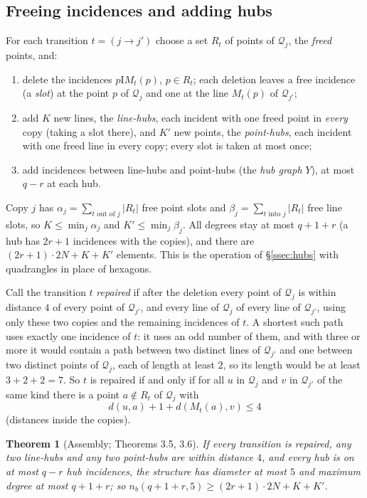 \documentclass[11pt]{amsart}
\newtheorem{theorem}{Theorem}[section]
\theoremstyle{definition}
\theoremstyle{remark}
\newcommand{\I}{\mathrel{\mathrm{I}}}
\newcommand{\cQ}{\mathcal{Q}}
\begin{document}
\subsection{Freeing incidences and adding hubs}\label{ssec:hubs5}
For each transition $t=(j\to j')$ choose a set $R_t$ of points of $\cQ_j$, the \emph{freed} points, and:
\begin{enumerate}[label=\textup{(\arabic*)},leftmargin=2.5em]
\item delete the incidences $p\I M_t(p)$, $p\in R_t$; each deletion leaves a free incidence (a \emph{slot}) at the point $p$ of $\cQ_j$ and one at the line $M_t(p)$ of $\cQ_{j'}$;
\item add $K$ new lines, the \emph{line-hubs}, each incident with one freed point in \emph{every} copy (taking a slot there), and $K'$ new points, the \emph{point-hubs}, each incident with one freed line in every copy; every slot is taken at most once;
\item add incidences between line-hubs and point-hubs (the \emph{hub graph} $Y$), at most $q-r$ at each hub.
\end{enumerate}
Copy $j$ has $\alpha_j=\sum_{t\text{ out of }j}|R_t|$ free point slots and $\beta_j=\sum_{t\text{ into }j}|R_t|$ free line slots, so $K\le\min_j\alpha_j$ and $K'\le\min_j\beta_j$. All degrees stay at most $q+1+r$ (a hub has $2r+1$ incidences with the copies), and there are $(2r+1)\cdot 2N+K+K'$ elements. This is the operation of \S\ref{ssec:hubs} with quadrangles in place of hexagons.

Call the transition $t$ \emph{repaired} if after the deletion every point of $\cQ_j$ is within distance $4$ of every point of $\cQ_{j'}$, and every line of $\cQ_j$ of every line of $\cQ_{j'}$, using only these two copies and the remaining incidences of $t$. A shortest such path uses exactly one incidence of $t$: it uses an odd number of them, and with three or more it would contain a path between two distinct lines of $\cQ_{j'}$ and one between two distinct points of $\cQ_j$, each of length at least $2$, so its length would be at least $3+2+2=7$. So $t$ is repaired if and only if for all $u$ in $\cQ_j$ and $v$ in $\cQ_{j'}$ of the same kind there is a point $a\notin R_t$ of $\cQ_j$ with
\[
d(u,a)+1+d(M_t(a),v)\le 4 \tag{$\ast$}
\]
(distances inside the copies).

\begin{theorem}[Assembly; Theorems 3.5, 3.6]\label{thm:assembly5}
If every transition is repaired, any two line-hubs and any two point-hubs are within distance $4$, and every hub is on at most $q-r$ hub incidences, the structure has diameter at most $5$ and maximum degree at most $q+1+r$; so $n_b(q+1+r,5)\ge(2r+1)\cdot 2N+K+K'$.
\end{theorem}
\end{document}
